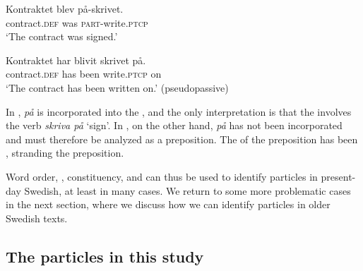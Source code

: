 \documentclass[output=paper]{langscibook}
\begin{document}
\ea\label{ex:lalu:14}
\ea\label{ex:lalu:14a}
\gll  Kontraktet   blev   på-skrivet.\\
    contract\textsc{.def}   was   \textsc{part-}write.\textsc{ptcp}\\
\glt `The contract was signed.'

\ex\label{ex:lalu:14b}
\gll  Kontraktet     har   blivit   skrivet     på. \\
    contract\textsc{.def}   has   been   write.\textsc{ptcp}   on\\
\glt `The contract has been written on.’ (pseudopassive)\\
\z
\z


In , \textit{på} is incorporated into the  , and the only interpretation is that the  involves the  verb \textit{skriva på} ‘sign’. In , on the other hand, \textit{på} has not been incorporated and must therefore be analyzed as a  preposition. The  of the preposition has been , stranding the preposition.



Word order, , constituency, and  can thus be used to identify particles in present-day Swedish, at least in many cases. We return to some more problematic cases in the next section, where we discuss how we can identify particles in older Swedish texts. 


\subsection{The particles in this study}\label{sec:lalu:2.3}
\end{document}
